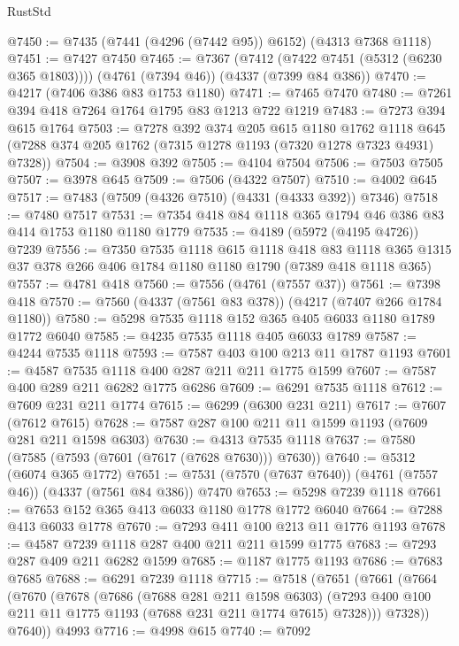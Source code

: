 \begin{lexlean}{RustStd}
\begin{coremodule}
@7450 := @7435 (@7441 (@4296 (@7442 @95)) @6152) (@4313 @7368 @1118)
@7451 := @7427 @7450
@7465 := @7367
    (@7412 (@7422 @7451 (@5312 (@6230 @365 @1803))))
    (@4761 (@7394 @46))
    (@4337 (@7399 @84 @386))
@7470 := @4217 (@7406 @386 @83 @1753 @1180)
@7471 := @7465 @7470
@7480 := @7261 @394 @418 @7264 @1764 @1795 @83 @1213 @722 @1219
@7483 := @7273 @394 @615 @1764
@7503 := @7278
    @392
    @374
    @205
    @615
    @1180
    @1762
    @1118
    @645
    (@7288 @374 @205 @1762 (@7315 @1278 @1193 (@7320 @1278 @7323 @4931) @7328))
@7504 := @3908 @392
@7505 := @4104 @7504
@7506 := @7503 @7505
@7507 := @3978 @645
@7509 := @7506 (@4322 @7507)
@7510 := @4002 @645
@7517 := @7483 (@7509 (@4326 @7510) (@4331 (@4333 @392)) @7346)
@7518 := @7480 @7517
@7531 := @7354 @418 @84 @1118 @365 @1794 @46 @386 @83 @414 @1753 @1180 @1180 @1779
@7535 := @4189 (@5972 (@4195 @4726)) @7239
@7556 := @7350
    @7535
    @1118
    @615
    @1118
    @418
    @83
    @1118
    @365
    @1315
    @37
    @378
    @266
    @406
    @1784
    @1180
    @1180
    @1790
    (@7389 @418 @1118 @365)
@7557 := @4781 @418
@7560 := @7556 (@4761 (@7557 @37))
@7561 := @7398 @418
@7570 := @7560 (@4337 (@7561 @83 @378)) (@4217 (@7407 @266 @1784 @1180))
@7580 := @5298 @7535 @1118 @152 @365 @405 @6033 @1180 @1789 @1772 @6040
@7585 := @4235 @7535 @1118 @405 @6033 @1789
@7587 := @4244 @7535 @1118
@7593 := @7587 @403 @100 @213 @11 @1787 @1193
@7601 := @4587 @7535 @1118 @400 @287 @211 @211 @1775 @1599
@7607 := @7587 @400 @289 @211 @6282 @1775 @6286
@7609 := @6291 @7535 @1118
@7612 := @7609 @231 @211 @1774
@7615 := @6299 (@6300 @231 @211)
@7617 := @7607 (@7612 @7615)
@7628 := @7587 @287 @100 @211 @11 @1599 @1193 (@7609 @281 @211 @1598 @6303)
@7630 := @4313 @7535 @1118
@7637 := @7580 (@7585 (@7593 (@7601 (@7617 (@7628 @7630))) @7630))
@7640 := @5312 (@6074 @365 @1772)
@7651 := @7531 (@7570 (@7637 @7640)) (@4761 (@7557 @46)) (@4337 (@7561 @84 @386)) @7470
@7653 := @5298 @7239 @1118
@7661 := @7653 @152 @365 @413 @6033 @1180 @1778 @1772 @6040
@7664 := @7288 @413 @6033 @1778
@7670 := @7293 @411 @100 @213 @11 @1776 @1193
@7678 := @4587 @7239 @1118 @287 @400 @211 @211 @1599 @1775
@7683 := @7293 @287 @409 @211 @6282 @1599
@7685 := @1187 @1775 @1193
@7686 := @7683 @7685
@7688 := @6291 @7239 @1118
@7715 := @7518
    (@7651
      (@7661
        (@7664
          (@7670
            (@7678
              (@7686
                (@7688 @281 @211 @1598 @6303)
                (@7293 @400 @100 @211 @11 @1775 @1193 (@7688 @231 @211 @1774 @7615) @7328)))
            @7328))
        @7640))
    @4993
@7716 := @4998 @615
@7740 := @7092

\end{coremodule}
\end{lexlean}
